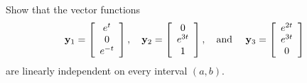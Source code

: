 \setcounter{example}{0}
\begin{example}
  \label{example:10.3.1} \rm Show that the vector functions
  \[
    {\bf y}_{1}=\left[
    \begin{array}{c}
      e^{t}  \\
      0      \\
      e^{-t}
    \end{array}\right],\quad{\bf y}_{2}=\left[
    \begin{array}{c}
      0      \\
      e^{3t} \\
      1
    \end{array}\right], \mbox{\quad and \quad}{\bf y}_{3}=\left[
    \begin{array}{c}
      e^{2t} \\
      e^{3t} \\
      0
    \end{array}\right]
  \]
  are linearly independent on every interval $(a,b)$.
\end{example}
